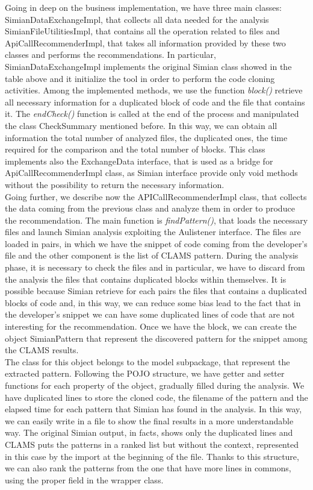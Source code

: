 Going in deep on the business implementation, we have three main classes: SimianDataExchangeImpl, that collects all data needed for the analysis SimianFileUtilitiesImpl, that contains all the operation related to files and ApiCallRecommenderImpl, that takes all information provided by these two classes and performs the recommendations. In particular, SimianDataExchangeImpl implements the original Simian class showed in the table above and it initialize the tool in order to perform the code cloning activities. Among the implemented methods, we use the function \textit{block()} retrieve all necessary information for a duplicated block of code and the file that contains it. The \textit{endCheck()} function is called at the end of the process and manipulated the class CheckSummary mentioned before. In this way, we can obtain all information the total number of analyzed files, the duplicated ones, the time required for the comparison and the total number of blocks. This class implements also the ExchangeData interface, that is used as a bridge for ApiCallRecommenderImpl class, as Simian interface provide only void methods without the possibility to return the necessary information.\\
Going further, we describe now the APICallRecommenderImpl class, that collects the data coming from the previous class and analyze them in order to produce the recommendation. The main function is \textit{findPattern()}, that loads the necessary files and launch Simian analysis exploiting the Aulistener interface. The files are loaded in pairs, in which we have the snippet of code coming from the developer's file and the other component is the list of CLAMS pattern. During the analysis phase, it is necessary to check the files and in particular, we have to discard from the analysis the files that contains duplicated blocks within themselves. It is possible because Simian retrieve for each pairs the files that contains a duplicated blocks of code and, in this way, we can reduce some bias lead to the fact that in the developer's snippet we can have some duplicated lines of code that are not interesting for the recommendation. Once we have the block, we can create the object SimianPattern that represent the discovered pattern for the snippet among the CLAMS results.\\
The class for this object belongs to the model subpackage, that represent the extracted pattern. Following the POJO structure, we have getter and setter functions for each property of the object, gradually filled during the analysis. We have duplicated lines to store the cloned code, the filename of the pattern and the elapsed time for each pattern that Simian has found in the analysis. In this way, we can easily write in a file to show the final results in a more understandable way. The original Simian output, in facts, shows only the duplicated lines and CLAMS puts the patterns in a ranked list but without the context, represented in this case by the import at the beginning of the file. Thanks to this structure, we can also rank the patterns from the one that have more lines in commons, using the proper field in the wrapper class.\\

